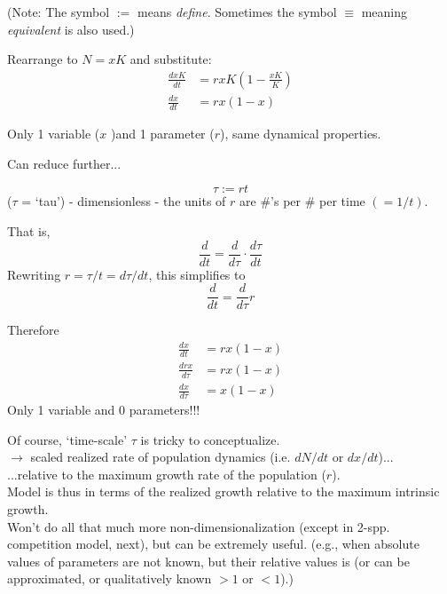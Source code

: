 \documentclass{article}
\newcommand{\ind}{\-\hspace{1cm}}
\begin{document}
(Note:  The symbol $:=$ means \emph{define}.  Sometimes the symbol $\equiv$ meaning \emph{equivalent} is also used.)

\vspace{0.5cm}

Rearrange to $N=xK$ and substitute:
\begin{align*}
      \frac{dxK}{dt}&=rxK \left( 1- \frac{xK}{K} \right)\\
       \frac{dx}{dt}&=rx \left( 1- x \right)
\end{align*}

Only 1 variable ($x$ )and 1 parameter ($r$), same dynamical properties.

Can reduce further...

\begin{equation*}
	\tau := r t
\end{equation*}
($\tau$ = `tau') - dimensionless - the units of $r$ are \#'s per \# per time $(=1/t)$. 

That is,
\begin{equation*} 
	\frac{d}{dt} = \frac{d}{d\tau} \cdot \frac{d\tau}{dt} 
\end{equation*}
Rewriting $r=\tau/t =d\tau/dt  $, this simplifies to
\begin{equation*}
	\frac{d}{dt} = \frac{d}{d\tau}r
\end{equation*}

\vspace{0.5cm}
Therefore
\begin{align*}
       \frac{dx}{dt}&=rx \left( 1- x \right)\\
       \frac{drx}{d\tau}&=rx \left( 1- x \right)\\
       \frac{dx}{d\tau}&=x \left( 1- x \right)
\end{align*}
Only 1 variable and 0 parameters!!!

Of course, `time-scale' $\tau$ is tricky to conceptualize.\\
\ind $\to$ scaled realized rate of population dynamics (i.e. $dN/dt$ or $dx/dt$)...\\
\ind \ind ...relative to the maximum growth rate of the population ($r$). \\

Model is thus in terms of the realized growth relative to the maximum intrinsic growth.\\

Won't do all that much more non-dimensionalization (except in 2-spp. competition model, next), but can be extremely useful.  (e.g., when absolute values of parameters are not known, but their relative values is (or can be approximated, or qualitatively known  $>1$ or $< 1$).)
\end{document}
